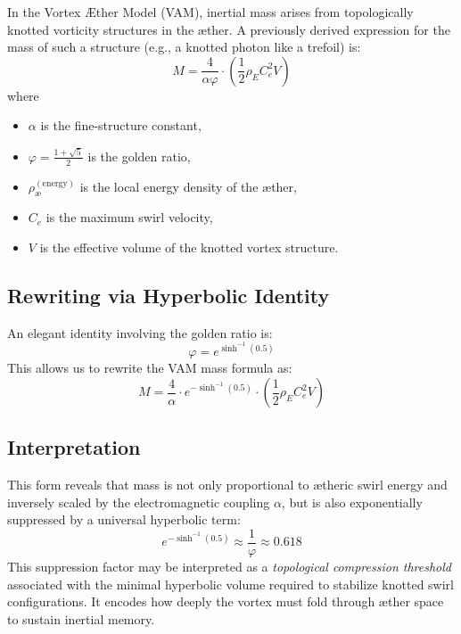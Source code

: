 \documentclass[12pt]{article}
\begin{document}
In the Vortex \AE{}ther Model (VAM), inertial mass arises from topologically knotted vorticity structures in the \ae{}ther. A previously derived expression for the mass of such a structure (e.g., a knotted photon like a trefoil) is:
\begin{equation}
  M = \frac{4}{\alpha \varphi} \cdot \left( \frac{1}{2} \rho_{\scriptscriptstyle\boldsymbol\!E}C_e^2 V \right)
\end{equation}
where
\begin{itemize}
\item $\alpha$ is the fine-structure constant,
\item $\varphi = \frac{1 + \sqrt{5}}{2}$ is the golden ratio,
\item $\rho_\text{\ae}^{(\text{energy})}$ is the local energy density of the \ae{}ther,
\item $C_e$ is the maximum swirl velocity,
\item $V$ is the effective volume of the knotted vortex structure.
\end{itemize}

\subsection{Rewriting via Hyperbolic Identity}

An elegant identity involving the golden ratio is:
\begin{equation}
  \varphi = e^{\sinh^{-1}(0.5)}
\end{equation}
This allows us to rewrite the VAM mass formula as:
\begin{equation}
\boxed{
M = \frac{4}{\alpha} \cdot e^{-\sinh^{-1}(0.5)} \cdot \left( \frac{1}{2} \rho_{\scriptscriptstyle\boldsymbol\!E}C_e^2 V \right)
}
\end{equation}

\subsection*{Interpretation}

This form reveals that mass is not only proportional to \ae{}theric swirl energy and inversely scaled by the electromagnetic coupling $\alpha$, but is also exponentially suppressed by a universal hyperbolic term:
\begin{equation}
  e^{-\sinh^{-1}(0.5)} \approx \frac{1}{\varphi} \approx 0.618
\end{equation}
This suppression factor may be interpreted as a \emph{topological compression threshold} associated with the minimal hyperbolic volume required to stabilize knotted swirl configurations. It encodes how deeply the vortex must fold through \ae{}ther space to sustain inertial memory.
\end{document}
